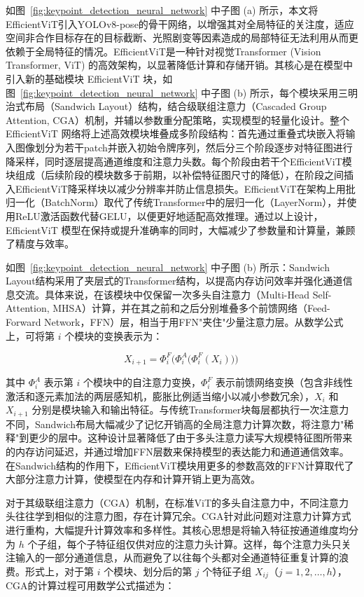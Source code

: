 如图~\ref{fig:keypoint_detection_neural_network} 中子图 (a) 所示，本文将EfficientViT引入YOLOv8-pose的骨干网络，以增强其对全局特征的关注度，适应空间非合作目标存在的目标截断、光照剧变等因素造成的局部特征无法利用从而更依赖于全局特征的情况。EfficientViT\cite{liu2023efficientvit}是一种针对视觉Transformer (Vision Transformer, ViT) 的高效架构，以显著降低计算和存储开销。其核心是在模型中引入新的基础模块 EfficientViT 块，如图~\ref{fig:keypoint_detection_neural_network} 中子图 (b) 所示，每个模块采用三明治式布局（Sandwich Layout）结构，结合级联组注意力（Cascaded Group Attention, CGA）机制，并辅以参数重分配策略，实现模型的轻量化设计。整个 EfficientViT 网络将上述高效模块堆叠成多阶段结构：首先通过重叠式块嵌入将输入图像划分为若干patch并嵌入初始令牌序列，然后分三个阶段逐步对特征图进行降采样，同时逐层提高通道维度和注意力头数。每个阶段由若干个EfficientViT模块组成（后续阶段的模块数多于前期，以补偿特征图尺寸的降低），在阶段之间插入EfficientViT降采样块以减少分辨率并防止信息损失。EfficientViT在架构上用批归一化（BatchNorm）取代了传统Transformer中的层归一化（LayerNorm），并使用ReLU激活函数代替GELU，以便更好地适配高效推理。通过以上设计，EfficientViT 模型在保持或提升准确率的同时，大幅减少了参数量和计算量，兼顾了精度与效率。

如图~\ref{fig:keypoint_detection_neural_network} 中子图 (b) 所示：Sandwich Layout结构采用了夹层式的Transformer结构，以提高内存访问效率并强化通道信息交流。具体来说，在该模块中仅保留一次多头自注意力（Multi-Head Self-Attention, MHSA）计算，并在其之前和之后分别堆叠多个前馈网络（Feed-Forward Network，FFN）层，相当于用FFN"夹住"少量注意力层。从数学公式上，可将第 $i$ 个模块的变换表示为：

\begin{equation}\label{eq:sandwich}
	X_{i+1} = \Phi^F_i\Big(\Phi^A_i\big(\Phi^F_i(X_i)\big)\Big)\,
\end{equation}

其中 $\Phi^A_i$ 表示第 $i$ 个模块中的自注意力变换，$\Phi^F_i$ 表示前馈网络变换（包含非线性激活和逐元素加法的两层感知机，膨胀比例适当缩小以减小参数冗余），$X_i$ 和 $X_{i+1}$ 分别是模块输入和输出特征。与传统Transformer块每层都执行一次注意力不同，Sandwich布局大幅减少了记忆开销高的全局注意力计算次数，将注意力"稀释"到更少的层中。这种设计显著降低了由于多头注意力读写大规模特征图所带来的内存访问延迟，并通过增加FFN层数来保持模型的表达能力和通道通信效率。在Sandwich结构的作用下，EfficientViT模块用更多的参数高效的FFN计算取代了大部分注意力计算，使模型在内存和计算开销上更为高效。

对于其级联组注意力（CGA）机制，在标准ViT的多头自注意力中，不同注意力头往往学到相似的注意力图，存在计算冗余。CGA针对此问题对注意力计算方式进行重构，大幅提升计算效率和多样性。其核心思想是将输入特征按通道维度均分为 $h$ 个子组，每个子特征组仅供对应的注意力头计算。这样，每个注意力头只关注输入的一部分通道信息，从而避免了以往每个头都对全通道特征重复计算的浪费。形式上，对于第 $i$ 个模块、划分后的第 $j$ 个特征子组 $X_{ij}$（$j=1,2,\dots,h$），CGA的计算过程可用数学公式描述为：

